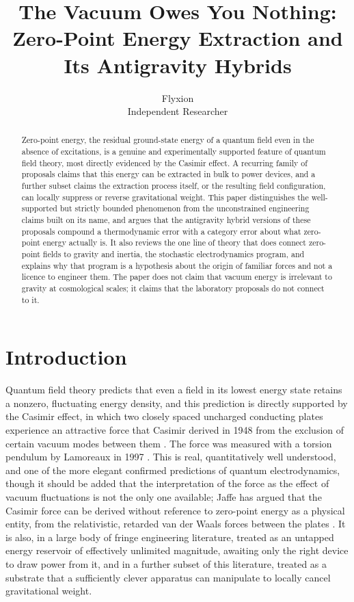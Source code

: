 \documentclass[11pt]{article}
\title{The Vacuum Owes You Nothing: Zero-Point Energy Extraction and Its Antigravity Hybrids}
\author{Flyxion \\ \small Independent Researcher}
\date{}
\begin{document}
\maketitle

\begin{abstract}
Zero-point energy, the residual ground-state energy of a quantum field even in the absence of excitations, is a genuine and experimentally supported feature of quantum field theory, most directly evidenced by the Casimir effect. A recurring family of proposals claims that this energy can be extracted in bulk to power devices, and a further subset claims the extraction process itself, or the resulting field configuration, can locally suppress or reverse gravitational weight. This paper distinguishes the well-supported but strictly bounded phenomenon from the unconstrained engineering claims built on its name, and argues that the antigravity hybrid versions of these proposals compound a thermodynamic error with a category error about what zero-point energy actually is. It also reviews the one line of theory that does connect zero-point fields to gravity and inertia, the stochastic electrodynamics program, and explains why that program is a hypothesis about the origin of familiar forces and not a licence to engineer them. The paper does not claim that vacuum energy is irrelevant to gravity at cosmological scales; it claims that the laboratory proposals do not connect to it.
\end{abstract}

\section{Introduction}

Quantum field theory predicts that even a field in its lowest energy state retains a nonzero, fluctuating energy density, and this prediction is directly supported by the Casimir effect, in which two closely spaced uncharged conducting plates experience an attractive force that Casimir derived in 1948 from the exclusion of certain vacuum modes between them \cite{C1948}. The force was measured with a torsion pendulum by Lamoreaux in 1997 \cite{L1997}. This is real, quantitatively well understood, and one of the more elegant confirmed predictions of quantum electrodynamics, though it should be added that the interpretation of the force as the effect of vacuum fluctuations is not the only one available; Jaffe has argued that the Casimir force can be derived without reference to zero-point energy as a physical entity, from the relativistic, retarded van der Waals forces between the plates \cite{J2005}. It is also, in a large body of fringe engineering literature, treated as an untapped energy reservoir of effectively unlimited magnitude, awaiting only the right device to draw power from it, and in a further subset of this literature, treated as a substrate that a sufficiently clever apparatus can manipulate to locally cancel gravitational weight.
\end{document}
